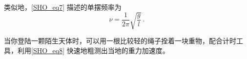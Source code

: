 类似地，\autoref{SHO_eq7} 描述的单摆频率为
\begin{equation}\label{SHO_eq8}
\nu = \frac{1}{2\pi}\sqrt{\frac{g}{l}}~.
\end{equation}

当你登陆一颗陌生天体时，可以用一根比较轻的绳子拴着一块重物，配合计时工具，利用\autoref{SHO_eq8} 快速地粗测出当地的重力加速度。












